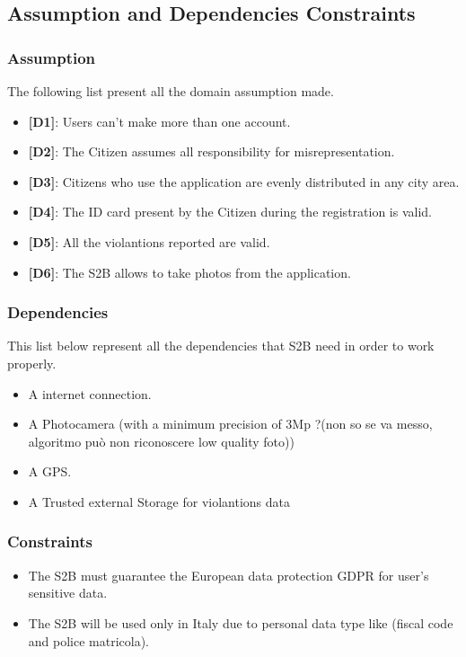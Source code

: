 \documentclass{article}
\begin{document}
\subsection{Assumption and Dependencies Constraints}
\subsubsection{Assumption}
The following list present all the domain assumption made.
\begin{itemize}
    \item \textbf{[D1]}: Users can't make more than one account.
    \item \textbf{[D2]}: The Citizen assumes all responsibility for misrepresentation.
    \item \textbf{[D3]}: Citizens who use the application are evenly distributed in any city area.
    \item \textbf{[D4]}: The ID card present by the Citizen during the registration is valid.
    \item \textbf{[D5]}: All the violantions reported are valid.
    \item \textbf{[D6]}: The S2B allows to take photos from the application.
\end{itemize}

\subsubsection{Dependencies}
This list below represent all the dependencies that S2B need in order to work properly.
\begin{itemize}
    \item A internet connection.
    \item A Photocamera (with a minimum precision of 3Mp ?(non so se va messo, algoritmo può non riconoscere low quality foto))
    \item A GPS.
    \item A Trusted external Storage for violantions data   
\end{itemize}

\subsubsection{Constraints}
\begin{itemize}
    \item The S2B must guarantee the European data protection GDPR for user's sensitive data.
    \item The S2B will be used only in Italy due to personal data type like (fiscal code and police matricola).
\end{itemize}
\end{document}
